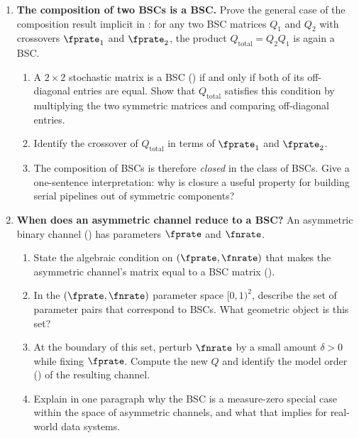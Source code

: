 \begin{enumerate}
\item \exstarstar
\textbf{The composition of two BSCs is a BSC.}
Prove the general case of the composition result implicit in
: for any two BSC matrices $Q_1$ and $Q_2$
with crossovers $\fprate_1$ and $\fprate_2$, the product
$Q_{\mathrm{total}} = Q_2 Q_1$ is again a BSC.
\begin{enumerate}
  \item[(a)] A $2 \times 2$ stochastic matrix is a BSC () if
    and only if both of its off-diagonal entries are equal. Show that
    $Q_{\mathrm{total}}$ satisfies this condition by multiplying the two
    symmetric matrices and comparing off-diagonal entries.
  \item[(b)] Identify the crossover of $Q_{\mathrm{total}}$ in terms of
    $\fprate_1$ and $\fprate_2$.
  \item[(c)] The composition of BSCs is therefore \emph{closed} in the class
    of BSCs. Give a one-sentence interpretation: why is closure a useful
    property for building serial pipelines out of symmetric components?
\end{enumerate}

\item \exstarstar
\textbf{When does an asymmetric channel reduce to a BSC?}
An asymmetric binary channel () has parameters
$\fprate$ and $\fnrate$.
\begin{enumerate}
  \item[(a)] State the algebraic condition on $(\fprate, \fnrate)$ that makes
    the asymmetric channel's matrix equal to a BSC matrix ().
  \item[(b)] In the $(\fprate, \fnrate)$ parameter space $[0,1)^2$, describe
    the set of parameter pairs that correspond to BSCs. What geometric object
    is this set?
  \item[(c)] At the boundary of this set, perturb $\fnrate$ by a small amount
    $\delta > 0$ while fixing $\fprate$. Compute the new $Q$ and identify the
    model order () of the resulting channel.
  \item[(d)] Explain in one paragraph why the BSC is a measure-zero special
    case within the space of asymmetric channels, and what that implies for
    real-world data systems.
\end{enumerate}


\end{enumerate}
